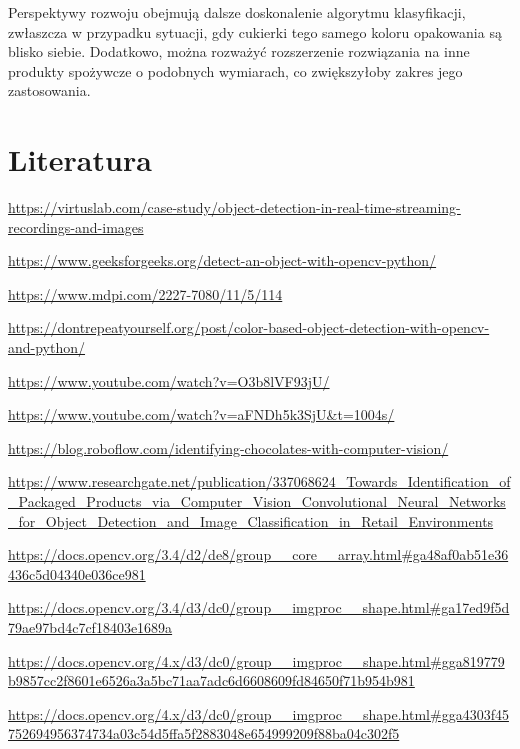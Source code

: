 \documentclass{article}
\begin{document}
Perspektywy rozwoju obejmują dalsze doskonalenie algorytmu klasyfikacji, zwłaszcza w przypadku sytuacji, gdy cukierki tego samego koloru opakowania są blisko siebie. Dodatkowo, można rozważyć rozszerzenie rozwiązania na inne produkty spożywcze o podobnych wymiarach, co zwiększyłoby zakres jego zastosowania.

\section{Literatura}
\label{Literatura}
\begin{thebibliography}{9}

\url{https://virtuslab.com/case-study/object-detection-in-real-time-streaming-recordings-and-images}

\url{https://www.geeksforgeeks.org/detect-an-object-with-opencv-python/}

\url{https://www.mdpi.com/2227-7080/11/5/114}

\url{https://dontrepeatyourself.org/post/color-based-object-detection-with-opencv-and-python/}

\url{https://www.youtube.com/watch?v=O3b8lVF93jU/}

\url{https://www.youtube.com/watch?v=aFNDh5k3SjU&t=1004s/}

\url{https://blog.roboflow.com/identifying-chocolates-with-computer-vision/}

 \url{https://www.researchgate.net/publication/337068624_Towards_Identification_of_Packaged_Products_via_Computer_Vision_Convolutional_Neural_Networks_for_Object_Detection_and_Image_Classification_in_Retail_Environments}

\url{https://docs.opencv.org/3.4/d2/de8/group__core__array.html#ga48af0ab51e36436c5d04340e036ce981}

\url{https://docs.opencv.org/3.4/d3/dc0/group__imgproc__shape.html#ga17ed9f5d79ae97bd4c7cf18403e1689a}

\url{https://docs.opencv.org/4.x/d3/dc0/group__imgproc__shape.html#gga819779b9857cc2f8601e6526a3a5bc71aa7adc6d6608609fd84650f71b954b981}

\url{https://docs.opencv.org/4.x/d3/dc0/group__imgproc__shape.html#gga4303f45752694956374734a03c54d5ffa5f2883048e654999209f88ba04c302f5}

\end{thebibliography}
\end{document}
